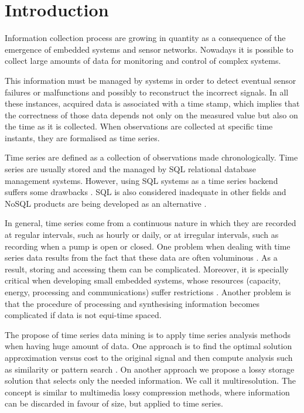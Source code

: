 


\section{Introduction}

Information collection process are growing in quantity as a
consequence of the emergence of embedded systems and sensor networks.
Nowadays it is possible to collect large amounts of data for
monitoring and control of complex systems.

This information must be managed by systems in order to detect
eventual sensor failures or malfunctions and possibly to reconstruct
the incorrect signals. In all these instances, acquired data is
associated with a time stamp, which implies that the correctness of
those data depends not only on the measured value but also on the time
as it is collected. When observations are collected at specific
time instants, they are formalised as time series.

Time series are defined as a collection of observations made
chronologically. Time series are usually stored and the managed by SQL
relational database management systems. However, using SQL systems as
a time series backend suffers some drawbacks
\cite{dreyer94,schmidt95,stonebraker09:scidb,zhang11}. SQL is also
considered inadequate in other fields and NoSQL products are being
developed as an alternative
\cite{atzeni13:relational_model_dead,stonebraker10}.

In general, time series come from a continuous nature in which they
are recorded at regular intervals, such as hourly or daily, or at
irregular intervals, such as recording when a pump is open or closed.
One problem when dealing with time series data results from the fact
that these data are often voluminous \cite{fu11,keogh08:isax}. As a
result, storing and accessing them can be complicated. Moreover, it is
specially critical when developing small embedded systems, whose
resources (capacity, energy, processing and communications) suffer
restrictions \cite{yaogehrke02}.  Another problem is that the
procedure of processing and synthesising information becomes
complicated if data is not equi-time spaced.

The propose of time series data mining is to apply time series
analysis methods when having huge amount of data.  One approach is to
find the optimal solution approximation versus cost to the original signal
and then compute analysis such as similarity or pattern search
\cite{fu11,keogh01,last01}. On another approach we propose a lossy storage
solution that selects only the needed information. We call it
multiresolution. The concept is similar to multimedia lossy
compression methods, where information can be discarded in favour of
size, but applied to time series.



